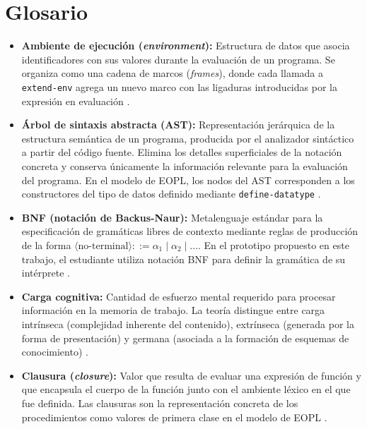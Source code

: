 \section{Glosario}

\begin{itemize}

    \item \textbf{Ambiente de ejecución (\textit{environment}):}
    Estructura de datos que asocia identificadores con sus valores durante la evaluación de un programa. Se organiza como una cadena de marcos (\textit{frames}), donde cada llamada a \texttt{extend-env} agrega un nuevo marco con las ligaduras introducidas por la expresión en evaluación \cite{Friedman2008EPL}.

    \item \textbf{Árbol de sintaxis abstracta (AST):}
    Representación jerárquica de la estructura semántica de un programa, producida por el analizador sintáctico a partir del código fuente. Elimina los detalles superficiales de la notación concreta y conserva únicamente la información relevante para la evaluación del programa. En el modelo de EOPL, los nodos del AST corresponden a los constructores del tipo de datos definido mediante \texttt{define-datatype} \cite{Friedman2008EPL}.

    \item \textbf{BNF (notación de Backus-Naur):}
    Metalenguaje estándar para la especificación de gramáticas libres de contexto mediante reglas de producción de la forma $\langle\text{no-terminal}\rangle \mathrel{::=} \alpha_1 \mid \alpha_2 \mid \ldots$. En el prototipo propuesto en este trabajo, el estudiante utiliza notación BNF para definir la gramática de su intérprete \cite{aho2006compilers}.

    \item \textbf{Carga cognitiva:}
    Cantidad de esfuerzo mental requerido para procesar información en la memoria de trabajo. La teoría distingue entre carga intrínseca (complejidad inherente del contenido), extrínseca (generada por la forma de presentación) y germana (asociada a la formación de esquemas de conocimiento) \cite{sweller2024cognitive}.

    \item \textbf{Clausura (\textit{closure}):}
    Valor que resulta de evaluar una expresión de función y que encapsula el cuerpo de la función junto con el ambiente léxico en el que fue definida. Las clausuras son la representación concreta de los procedimientos como valores de primera clase en el modelo de EOPL \cite{Friedman2008EPL}.


\end{itemize}
